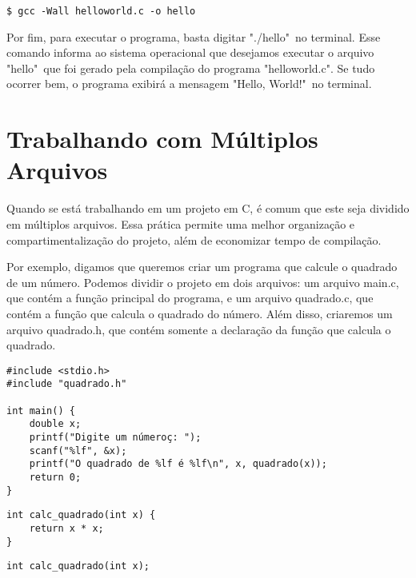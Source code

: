\begin{scriptsize}
\estilobash
\begin{lstlisting}
$ gcc -Wall helloworld.c -o hello
\end{lstlisting}
\end{scriptsize}

Por fim, para executar o programa, basta digitar "./hello"\ no terminal. Esse comando informa ao sistema operacional que desejamos executar o arquivo "hello"\ que foi gerado pela compilação do programa "helloworld.c". Se tudo ocorrer bem, o programa exibirá a mensagem "Hello, World!"\ no terminal.



\section{Trabalhando com Múltiplos Arquivos}
Quando se está trabalhando em um projeto em C, é comum que este seja dividido em múltiplos arquivos. Essa prática permite uma melhor organização e compartimentalização do projeto, além de economizar tempo de compilação.

Por exemplo, digamos que queremos criar um programa que calcule o quadrado de um número. Podemos dividir o projeto em dois arquivos: um arquivo main.c, que contém a função principal do programa, e um arquivo quadrado.c, que contém a função que calcula o quadrado do número. Além disso, criaremos um arquivo quadrado.h, que contém somente a declaração da função que calcula o quadrado.
\begin{scriptsize}
\estiloC
\begin{lstlisting}[title=main.c]
#include <stdio.h>
#include "quadrado.h"

int main() {
    double x;
    printf("Digite um númeroç: ");
    scanf("%lf", &x);
    printf("O quadrado de %lf é %lf\n", x, quadrado(x));
    return 0;
}
\end{lstlisting}
\end{scriptsize}
\begin{scriptsize}
\estiloC
\begin{lstlisting}[title=quadrado.c]
int calc_quadrado(int x) {
    return x * x;
}
\end{lstlisting}
\end{scriptsize}
\begin{scriptsize}
\estiloC
\begin{lstlisting}[title=quadrado.h]
int calc_quadrado(int x);
\end{lstlisting}
\end{scriptsize}

